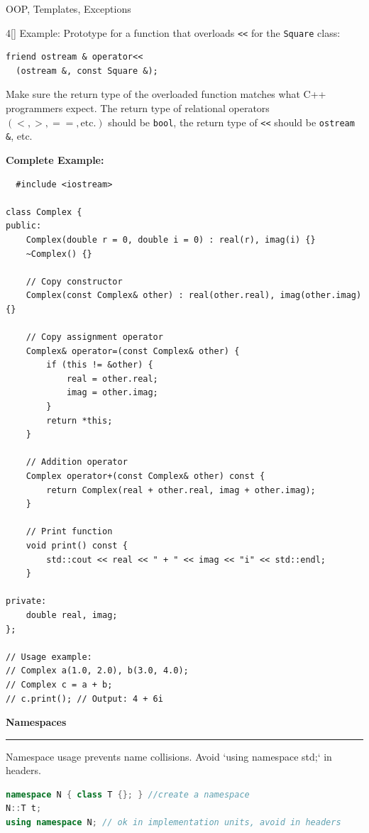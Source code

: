 \documentclass[final]{beamer}
\renewcommand{\subsection}[1]{%
  \par\vspace{1em}%
  {\noindent\large\bfseries #1\par}%
  \vspace{0.5em}\hrule\vspace{1em}%
}
\begin{document}
\begin{frame}[t,fragile]{OOP, Templates, Exceptions}
\begin{multicols}{4}[\setlength{\columnsep}{1.5cm}]
Example:
Prototype for a function that overloads \texttt{<<} for the \texttt{Square} class:
\begin{lstlisting}
friend ostream & operator<<
  (ostream &, const Square &);
\end{lstlisting}
Make sure the return type of the overloaded function matches what C++ programmers expect. The return type of relational operators $(<, >, ==, \text{etc.})$ should be \texttt{bool}, the return type of \texttt{<<} should be \texttt{ostream \&}, etc.

\textbf{Complete Example:}

\begin{lstlisting}
  #include <iostream>

class Complex {
public:
    Complex(double r = 0, double i = 0) : real(r), imag(i) {}
    ~Complex() {}

    // Copy constructor
    Complex(const Complex& other) : real(other.real), imag(other.imag) {}

    // Copy assignment operator
    Complex& operator=(const Complex& other) {
        if (this != &other) {
            real = other.real;
            imag = other.imag;
        }
        return *this;
    }

    // Addition operator
    Complex operator+(const Complex& other) const {
        return Complex(real + other.real, imag + other.imag);
    }

    // Print function
    void print() const {
        std::cout << real << " + " << imag << "i" << std::endl;
    }

private:
    double real, imag;
};

// Usage example:
// Complex a(1.0, 2.0), b(3.0, 4.0);
// Complex c = a + b;
// c.print(); // Output: 4 + 6i
\end{lstlisting}




\subsection{Namespaces}
Namespace usage prevents name collisions. Avoid `using namespace std;` in headers.
\begin{lstlisting}[language=C++]
namespace N { class T {}; } //create a namespace
N::T t;
using namespace N; // ok in implementation units, avoid in headers
\end{lstlisting}




\end{multicols}
\end{frame}
\end{document}
